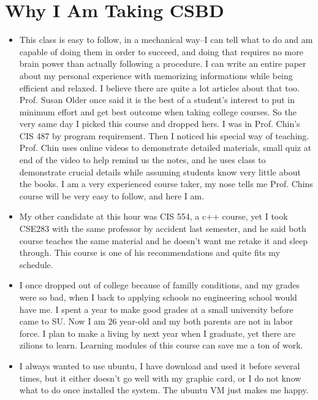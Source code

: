 \documentclass{article}
\begin{document}
\section{Why I Am Taking CSBD}
\label{sec:why-i-am}
\begin{itemize}
\item This class is easy to follow, in a mechanical
  way--I can tell what to do and am capable of doing them in order to
  succeed, and doing that requires no more brain power than actually
  following a procedure. I can write an entire paper about my personal
  experience with memorizing informations while being efficient and
  relaxed. I believe there are quite a lot articles about that
  too. Prof. Susan Older once said it is the best of a student's
  interest to put in minimum effort and get best outcome when taking
  college courses. So the very same day I picked this course and
  dropped hers. I was in Prof. Chin's CIS 487 by program
  requirement. Then I noticed his special way of teaching. Prof. Chin
  uses online videos to demonstrate detailed materials, small quiz at
  end of the video to help remind us the notes, and he uses class to
  demonstrate crucial details while assuming students know very little
  about the books. I am a very experienced course taker, my nose tells
  me Prof. Chins course will be very easy to follow, and here I am.
\item My other candidate at this hour was CIS 554, a c++ course, yet I
  took CSE283 with the same professor by accident last semester, and
  he said both course teaches the same material and he doesn't want me
  retake it and sleep through. This course is one of his
  recommendations and quite fits my schedule.
\item I once dropped out of college because of familly conditions, and
  my grades were so bad, when I back to applying schools no
  engineering school would have me. I spent a year to make good grades
  at a small university before came to SU. Now I am 26 year-old and my
  both parents are not in labor force. I plan to make a living by next
  year when I graduate, yet there are zilions to learn. Learning
  modules of this course can save me a ton of work.

\item I always wanted to use ubuntu, I have download and used it before several times, but it either doesn't go well with my graphic card, or I do not know what to do once installed the system. The ubuntu VM just makes me happy.

\end{itemize}
\end{document}
